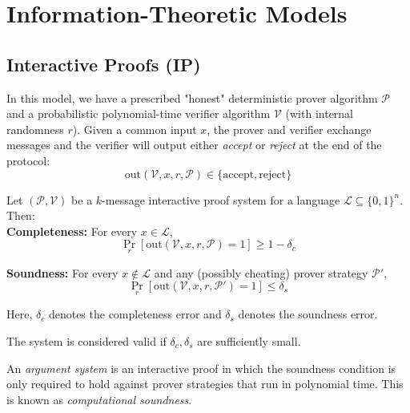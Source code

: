 \section{Information-Theoretic Models}

\subsection{Interactive Proofs (IP)}

In this model, we have a prescribed "honest" deterministic prover algorithm $\mathcal{P}$ and a probabilistic polynomial-time verifier algorithm $\mathcal{V}$ (with internal randomness $r$). Given a common input $x$, the prover and verifier exchange messages and the verifier will output either \emph{accept} or \emph{reject} at the end of the protocol: \\

$$\text{out}(\mathcal{V}, x, r, \mathcal{P}) \in \{\text{accept},\text{reject}\}$$

\myspace

\begin{definition}
Let $(\mathcal{P}, \mathcal{V})$ be a $k$-message interactive proof system for a language $\mathcal{L} \subseteq \{0,1\}^n$. Then: \\

\textbf{Completeness:} For every $x \in \mathcal{L}$,
$$
\Pr_r[\text{out}(\mathcal{V}, x, r, \mathcal{P}) = 1] \ge 1 - \delta_c
$$

\textbf{Soundness:} For every $x \notin \mathcal{L}$ and any (possibly cheating) prover strategy $\mathcal{P}'$,
$$
\Pr_r[\text{out}(\mathcal{V}, x, r, \mathcal{P}') = 1] \le \delta_s
$$

Here, $\delta_c$ denotes the completeness error and  $\delta_s$ denotes the soundness error.  
\end{definition}

\begin{remark}
The system is considered valid if $\delta_c, \delta_s$ are sufficiently small.
\end{remark}

\myspace

\begin{definition} An \emph{argument system} is an interactive proof in which the soundness
condition is only required to hold against prover strategies that run in polynomial time. This is known as \emph{computational soundness}.
\end{definition} \\

